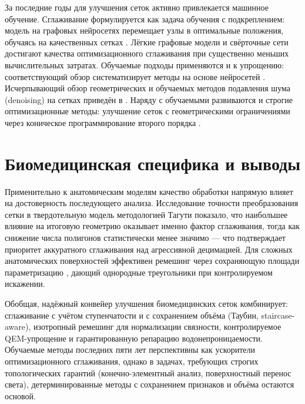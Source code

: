 \documentclass[a4paper,14pt]{article}
\begin{document}
За последние годы для улучшения сеток активно привлекается машинное обучение. Сглаживание формулируется как задача обучения с подкреплением: модель на графовых нейросетях перемещает узлы в оптимальные положения, обучаясь на качественных сетках \cite{wang2023drl, gnnrl2024}. Лёгкие графовые модели \cite{gmsnet2024} и свёрточные сети \cite{cnn2025} достигают качества оптимизационного сглаживания при существенно меньших вычислительных затратах. Обучаемые подходы применяются и к упрощению: соответствующий обзор систематизирует методы на основе нейросетей \cite{simplifysurvey2025}. Исчерпывающий обзор геометрических и обучаемых методов подавления шума (denoising) на сетках приведён в \cite{denoising2023}. Наряду с обучаемыми развиваются и строгие оптимизационные методы: улучшение сеток с геометрическими ограничениями через коническое программирование второго порядка \cite{meshcone2024}.

\section{Биомедицинская специфика и выводы}

Применительно к анатомическим моделям качество обработки напрямую влияет на достоверность последующего анализа. Исследование точности преобразования сетки в твердотельную модель методологией Тагути \cite{taguchi2023} показало, что наибольшее влияние на итоговую геометрию оказывает именно фактор сглаживания, тогда как снижение числа полигонов статистически менее значимо --- что подтверждает приоритет аккуратного сглаживания над агрессивной децимацией. Для сложных анатомических поверхностей эффективен ремешинг через сохраняющую площади параметризацию \cite{choi2021}, дающий однородные треугольники при контролируемом искажении.

Обобщая, надёжный конвейер улучшения биомедицинских сеток комбинирует: сглаживание с учётом ступенчатости и с сохранением объёма (Таубин, staircase-aware), изотропный ремешинг для нормализации связности, контролируемое QEM-упрощение и гарантированную репарацию водонепроницаемости. Обучаемые методы последних пяти лет перспективны как ускорители оптимизационного сглаживания, однако в задачах, требующих строгих топологических гарантий (конечно-элементный анализ, поверхностный перенос света), детерминированные методы с сохранением признаков и объёма остаются основой.
\end{document}
